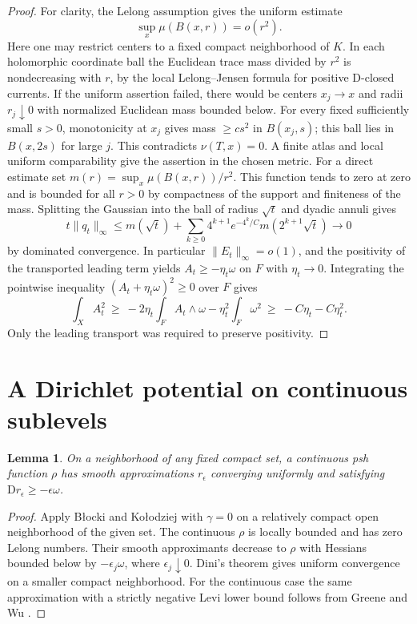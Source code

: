 \documentclass[11pt]{amsart}
\newtheorem{lemma}[theorem]{Lemma}
\theoremstyle{remark}
\numberwithin{equation}{section}
\newcommand{\D}{\mathrm{D}}
\begin{document}
\begin{proof}
For clarity, the Lelong assumption gives the uniform estimate
\[
   \sup_x\mu(B(x,r))=o(r^2).
\]
Here one may restrict centers to a fixed compact neighborhood of \(K\).
In each holomorphic coordinate ball the Euclidean trace mass
divided by \(r^2\) is nondecreasing with \(r\), by the local
Lelong--Jensen formula for positive \(\D\)-closed currents.
If the uniform assertion failed, there would be centers \(x_j\to x\)
and radii \(r_j\downarrow0\) with normalized Euclidean mass
bounded below. For every fixed sufficiently small \(s>0\),
monotonicity at \(x_j\) gives mass \(\geq c s^2\) in \(B(x_j,s)\);
this ball lies in \(B(x,2s)\) for large \(j\).
This contradicts \(\nu(T,x)=0\). A finite atlas and local uniform
comparability give the assertion in the chosen metric.
For a direct estimate set \(m(r)=\sup_x\mu(B(x,r))/r^2\).
This function tends to zero at zero and is bounded for all \(r>0\)
by compactness of the support and finiteness of the mass. Splitting
the Gaussian into the ball of radius \(\sqrt t\) and dyadic annuli gives
\[
 t\|q_t\|_\infty\le m(\sqrt t)+
 \sum_{k\ge0}4^{k+1}e^{-4^k/C}m(2^{k+1}\sqrt t)\longrightarrow0
\]
by dominated convergence. In particular
\(\|E_t\|_\infty=o(1)\), and the positivity of the transported
leading term yields \(A_t\geq-\eta_t\omega\) on \(F\) with
\(\eta_t\to0\). Integrating the pointwise inequality
\((A_t+\eta_t\omega)^2\geq0\) over \(F\) gives
\[
   \int_X A_t^2\ \geq\
   -2\eta_t\int_F A_t\wedge\omega-\eta_t^2\int_F\omega^2
   \ \geq\ -C\eta_t-C\eta_t^2 .
\]
Only the leading transport was required to preserve positivity.
\end{proof}

\section{A Dirichlet potential on continuous sublevels}

\begin{lemma}\label{lem:almost}
On a neighborhood of any fixed compact set, a continuous psh function
\(\rho\) has smooth approximations \(r_\epsilon\) converging uniformly
and satisfying \(\D r_\epsilon\geq-\epsilon\omega\).
\end{lemma}
\begin{proof}
Apply B{\l}ocki and Ko{\l}odziej \cite[Theorem~2]{BK} with
\(\gamma=0\) on a relatively compact open neighborhood of the given
set. The continuous \(\rho\) is locally bounded and has zero Lelong
numbers. Their smooth approximants decrease to \(\rho\) with Hessians
bounded below by \(-\epsilon_j\omega\), where \(\epsilon_j\downarrow0\).
Dini's theorem gives uniform convergence on a smaller compact
neighborhood. For the continuous case the same approximation with a
strictly negative Levi lower bound follows from Greene and Wu
\cite[\S4, Theorem~4.1 and Corollary~2]{GW}.
\end{proof}
\end{document}
